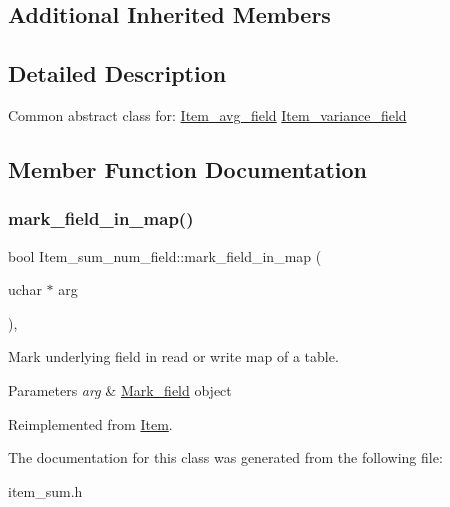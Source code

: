 \subsection*{Additional Inherited Members}


\subsection{Detailed Description}
Common abstract class for\+: \mbox{\hyperlink{classItem__avg__field}{Item\+\_\+avg\+\_\+field}} \mbox{\hyperlink{classItem__variance__field}{Item\+\_\+variance\+\_\+field}} 

\subsection{Member Function Documentation}
\mbox{\label{classItem__sum__num__field_a2c9ebf8dd31a83c22860bcb2c68c8c60}} 
\subsubsection{\texorpdfstring{mark\+\_\+field\+\_\+in\+\_\+map()}{mark\_field\_in\_map()}}
{\footnotesize\ttfamily bool Item\+\_\+sum\+\_\+num\+\_\+field\+::mark\+\_\+field\+\_\+in\+\_\+map (\begin{DoxyParamCaption}\item[{uchar $\ast$}]{arg }\end{DoxyParamCaption})\hspace{0.3cm}{\ttfamily [inline]}, {\ttfamily [virtual]}}

Mark underlying field in read or write map of a table.


\begin{DoxyParams}{Parameters}
{\em arg} & \mbox{\hyperlink{classMark__field}{Mark\+\_\+field}} object \\
\hline
\end{DoxyParams}


Reimplemented from \mbox{\hyperlink{classItem_ada2ce79ccf5ef1273b9e1654448944c1}{Item}}.



The documentation for this class was generated from the following file\+:\begin{DoxyCompactItemize}
\item 
item\+\_\+sum.\+h\end{DoxyCompactItemize}
